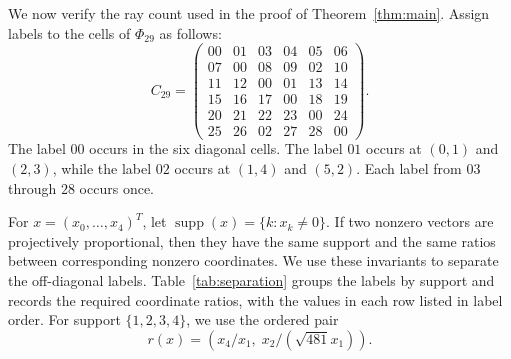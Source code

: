 \documentclass[11pt]{article}
\theoremstyle{definition}
\begin{document}
We now verify the ray count used in the proof of Theorem~\ref{thm:main}.
Assign labels to the cells of $\Phi_{29}$ as follows:
\begin{equation}\label{eq:C29}
C_{29}=
\begin{pmatrix}
00&01&03&04&05&06\\
07&00&08&09&02&10\\
11&12&00&01&13&14\\
15&16&17&00&18&19\\
20&21&22&23&00&24\\
25&26&02&27&28&00
\end{pmatrix}.
\end{equation}
The label $00$ occurs in the six diagonal cells.  The label $01$ occurs at
$(0,1)$ and $(2,3)$, while the label $02$ occurs at $(1,4)$ and $(5,2)$.
Each label from $03$ through $28$ occurs once.

For $x=(x_0,\ldots,x_4)^T$, let
$\operatorname{supp}(x)=\{k:x_k\ne0\}$.  If two nonzero vectors are
projectively proportional, then they have the same support and the same
ratios between corresponding nonzero coordinates.  We use these invariants
to separate the off-diagonal labels.  Table~\ref{tab:separation} groups the
labels by support and records the required coordinate ratios, with the values
in each row listed in label order.  For support $\{1,2,3,4\}$, we use the
ordered pair
\[
r(x)=\left(x_4/x_1,\;x_2/(\sqrt{481}x_1)\right).
\]
\end{document}
